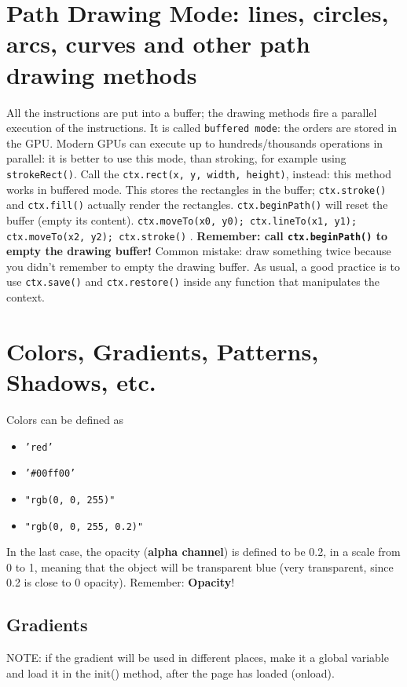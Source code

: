 \documentclass[a4paper,11pt]{book}
\begin{document}
\section{Path Drawing Mode: lines, circles, arcs, curves and other path drawing methods}
All the instructions are put into a buffer; the drawing methods fire a parallel execution of the instructions.
It is called \texttt{buffered mode}: the orders are stored in the GPU. Modern GPUs can execute up to hundreds/thousands
operations in parallel: it is better to use this mode, than stroking, for example using \texttt{strokeRect()}.
Call the \texttt{ctx.rect(x, y, width, height)}, instead: this method works in buffered mode. This stores the
rectangles in the buffer; \texttt{ctx.stroke()} and \texttt{ctx.fill()} actually render the rectangles.
\texttt{ctx.beginPath()} will reset the buffer (empty its content).
\texttt{ctx.moveTo(x0, y0); ctx.lineTo(x1, y1); ctx.moveTo(x2, y2); ctx.stroke()} .
\textbf{Remember: call \texttt{ctx.beginPath()} to empty the drawing buffer!} Common mistake: draw something twice because you
didn't remember to empty the drawing buffer. As usual, a good practice is to use \texttt{ctx.save()} and
\texttt{ctx.restore()} inside any function that manipulates the context.

\section{Colors, Gradients, Patterns, Shadows, etc.}
Colors can be defined as
\begin{itemize}
\item \texttt{'red'}
\item \texttt{'\#00ff00'}
\item \texttt{"rgb(0, 0, 255)"}
\item \texttt{"rgb(0, 0, 255, 0.2)"}
\end{itemize}
In the last case, the opacity (\textbf{alpha channel}) is defined to be 0.2, in a scale from 0 to 1, meaning that
the object will be transparent blue (very transparent, since 0.2 is close to 0 opacity). Remember: \textbf{Opacity}!
\subsection{Gradients}
NOTE: if the gradient will be used in different places, make it a global variable and load it in the init() method,
after the page has loaded (onload).
\end{document}

